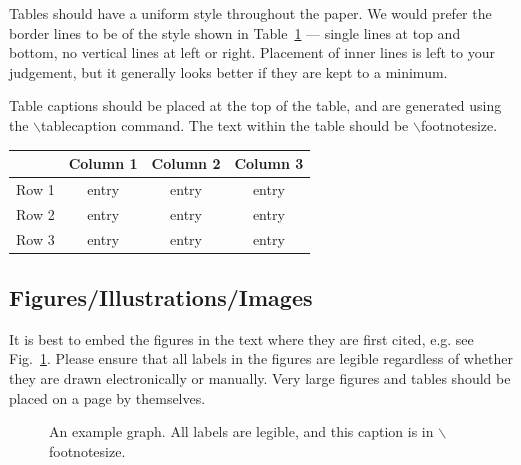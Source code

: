 \documentclass{evolang11}
\begin{document}
Tables should have a uniform style throughout the paper.  We would
prefer the border lines to be of the style shown in Table~\ref{table1}
--- single lines at top and bottom, no vertical lines at left or
right.  Placement of inner lines is left to your judgement, but it
generally looks better if they are kept to a minimum.

Table captions should be placed at the top of the table, and are
generated using the $\backslash$tablecaption command.  The text within
the table should be $\backslash$footnotesize.


\begin{table}[ht]
{\footnotesize
\begin{tabular}{@{}cccc@{}}
\hline
 & Column 1 & Column 2 & Column 3\\
\hline
Row 1 & entry & entry & entry \\
Row 2 & entry & entry & entry \\
Row 3 & entry & entry & entry \\

\hline
\end{tabular}\label{table1}}
\end{table}


\subsection{Figures/Illustrations/Images}

It is best to embed the figures in the text where they are first cited,
e.g. see Fig.~\ref{inter}. Please ensure that all labels in the
figures are legible regardless of whether they are drawn electronically or manually.  Very large figures and tables should be placed
on a page by themselves.


\begin{figure}[ht]
\begin{center}
\end{center}
\caption{{\footnotesize An example graph.  All labels are legible, and
    this caption is in $\backslash$footnotesize. \label{inter}}}
\end{figure}
\end{document}
